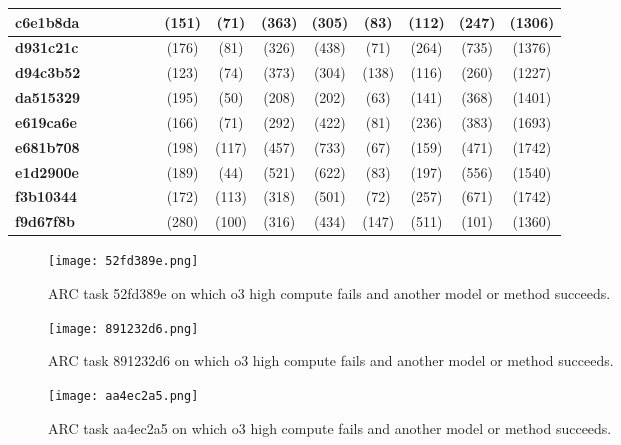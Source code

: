 \begin{table*}[htb]
\begin{tabular}{l|c|cccc|ccccc|ccc}
\midrule
\textbf{c6e1b8da} & \X  & \X  & \X & \X  & \X  & \X (151) & \X (71) & \X (363) & \X (305) & \X (83) & \X (112) & \X (247)& \X (1306)\\
\midrule
\textbf{d931c21c} & \X  & \X  & \X & \X  & \X  & \X (176) & \X (81) & \X (326) & \X (438) & \X (71) & \X (264) & \X (735)& \X (1376)\\
\midrule
\textbf{d94c3b52} & \X  & \X  & \X & \X  & \X  & \X (123) & \X (74) & \X (373) & \X (304) & \X (138) & \X (116) & \X (260)& \X (1227)\\
\midrule
\textbf{da515329} & \X  & \X  & \X & \X  & \X  & \X (195) & \X (50) & \X (208) & \X (202) & \X (63) & \X (141) & \X (368)& \X (1401)\\
\midrule
\textbf{e619ca6e} & \X  & \X  & \X & \X  & \X  & \X (166) & \X (71) & \X (292) & \X (422) & \X (81)  & \X (236) & \X (383)& \X (1693)\\
\midrule
\textbf{e681b708} & \X  & \X  & \X & \X  & \X  & \X (198) & \X (117) & \X (457) & \X (733) & \X (67) & \X (159) & \X (471)& \X (1742)\\
\midrule
\textbf{e1d2900e} & \X  & \X  & \X & \X  & \X  & \X (189) & \X (44) & \X (521) & \X (622) & \X (83) & \X (197) & \X (556)& \X (1540)\\
\midrule
\textbf{f3b10344} & \C & \X  & \X  & \X  & \X & \X (172) & \X (113) & \X (318) & \X (501) & \X (72)& \C (257) & \C (671) & \C (1742)\\
\midrule
\textbf{f9d67f8b} & \X  & \X  & \X & \X  & \X  & \X (280) & \X (100) & \X (316) & \X (434) & \X (147) & \X (511)& \X (101) & \X (1360)\\
\bottomrule
\end{tabular}
\label{tab:ARCo3fails}
\vspace{-10pt}
\end{table*}


\begin{figure}[H]
    \centering
    \texttt{[image: 52fd389e.png]}
    \label{fig:ARCeval}
    \caption{ARC task 52fd389e on which o3 high compute fails and another model or method succeeds.}
\end{figure}

\begin{figure}[H]
    \centering
    \texttt{[image: 891232d6.png]}
    \label{fig:ARCeval}
    \caption{ARC task 891232d6 on which o3 high compute fails and another model or method succeeds.}
\end{figure}

\begin{figure}[H]
    \centering
    \texttt{[image: aa4ec2a5.png]}
    \label{fig:ARCeval}
    \caption{ARC task aa4ec2a5 on which o3 high compute fails and another model or method succeeds.}
\end{figure}


